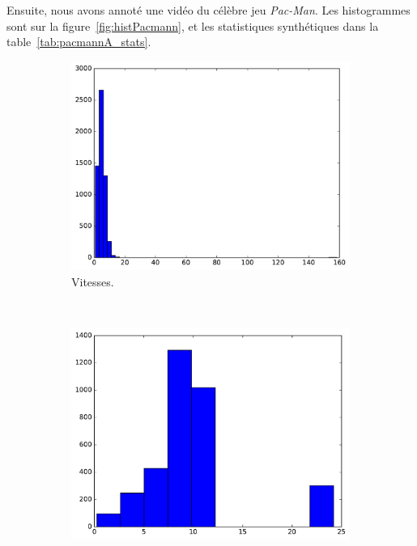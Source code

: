 	Ensuite, nous avons annoté une vidéo du célèbre jeu \emph{Pac-Man}. Les histogrammes sont sur la figure~\ref{fig:histPacmann}, et les statistiques synthétiques dans la table~\ref{tab:pacmannA_stats}.
	
	\begin{figure}[!htbp]
		\begin{subfigure}[t]{\subImgWclicks}
			\centering
			\includegraphics[width=\textwidth]{figures/ch3/pacmannA_filteredSpeed}
			\caption{Vitesses.}
			\label{fig:pacmannA_filteredSpeed}
		\end{subfigure}
		~
		\begin{subfigure}[t]{\subImgWclicks}
			\centering
			\includegraphics[width=\textwidth]{figures/ch3/pacmannA_frequency}

\end{subfigure}
\end{figure}
